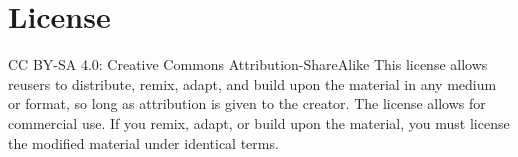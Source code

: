 \documentclass[american,11pt,letterpaper]{article}
\begin{document}
\setcounter{subsection}{0}
\section*{License}
CC BY-SA 4.0: Creative Commons Attribution-ShareAlike
This license allows reusers to distribute, remix, adapt, and build upon the material in any medium or format, so long as attribution is given to the creator. The license allows for commercial use. If you remix, adapt, or build upon the material, you must license the modified material under identical terms.
\end{document}
